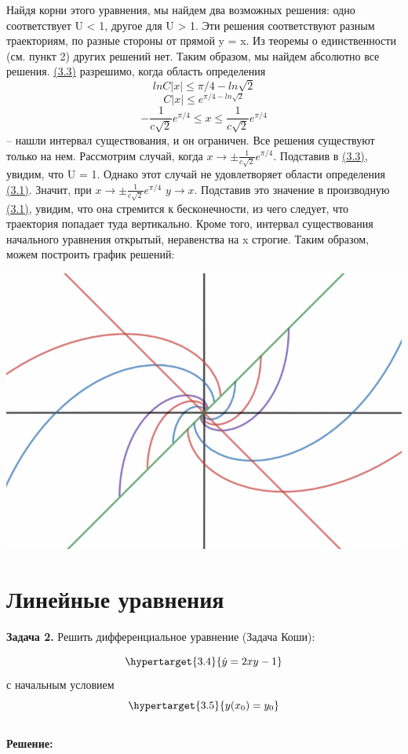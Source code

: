 \documentclass[10pt]{report}
\begin{document}
Найдя корни этого уравнения, мы найдем два возможных решения: одно соответствует U < 1, другое для U > 1. Эти решения соответствуют разным траекториям, по разные стороны от прямой y = x. Из теоремы о единственности (см. пункт 2) других решений нет. Таким образом, мы найдем абсолютно все решения. \hyperlink{3.3}{(3.3)} разрешимо, когда область определения 
\[
lnC|x| \leq \pi/4 - ln \sqrt{2}\]\[
C|x| \leq e^{\pi/4 - ln \sqrt{2}}\]
\[
- \frac 1 {c\sqrt{2}} e^{\pi/4} \leq x \leq \frac 1 {c\sqrt{2}} e^{\pi/4} \] -- нашли интервал существования, и он ограничен. Все решения существуют только на нем.
Рассмотрим случай, когда $x \rightarrow \pm \frac 1 {c\sqrt{2}} e^{\pi/4} $. Подставив в \hyperlink{3.3}{(3.3)}, увидим, что U = 1. Однако этот случай не удовлетворяет области определения \hyperlink{3.1}{(3.1)}. Значит, при $x \rightarrow \pm \frac 1 {c\sqrt{2}} e^{\pi/4}$ $ y \rightarrow x $. Подставив это значение в производную \hyperlink{3.1}{(3.1)}, увидим, что она стремится к бесконечности, из чего следует, что траектория попадает туда вертикально. Кроме того, интервал существования начального уравнения открытый, неравенства на x строгие. Таким образом, можем построить график решений:
\begin{center}
{\includegraphics[scale=0.5]{graph3.3.png}} 
\end{center}
\newpage
\section {Линейные уравнения}
 \textbf{Задача 2.} Решить дифференциальное уравнение (Задача Коши): 

\begin{equation}
\hypertarget{3.4}{\dot{y} = 2xy -1 }
\end{equation}
\newline
с начальным условием
\newline
\begin{equation}
\hypertarget{3.5}{y(x_0) = y_0}
\end{equation}\\
\textbf {Решение:}
\end{document}
